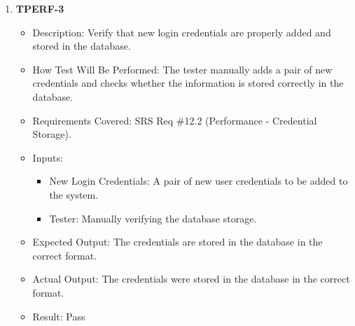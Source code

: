 \documentclass[12pt, titlepage]{article}
\begin{document}
\begin{enumerate}
 \item \textbf{TPERF-3}  
    \begin{itemize}
        \item Description: Verify that new login credentials are properly added and stored in the database.
        \item How Test Will Be Performed: The tester manually adds a pair of new credentials and checks whether the information is stored correctly in the database.
        \item Requirements Covered: SRS Req \#12.2 (Performance - Credential Storage).
        \item Inputs:  
            \begin{itemize}
                \item New Login Credentials: A pair of new user credentials to be added to the system.
                \item Tester: Manually verifying the database storage.
            \end{itemize}
        \item Expected Output: The credentials are stored in the database in the correct format.
        \item Actual Output: The credentials were stored in the database in the correct format.
        \item Result: Pass
    \end{itemize}


\end{enumerate}
\end{document}
